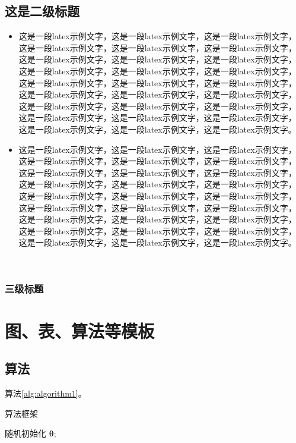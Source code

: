 \documentclass{template} %
\begin{document}
\begin{multicols}{2}
        \subsection{这是二级标题}
        \begin{itemize}
        \item 这是一段latex示例文字\cite{reddy2013polypharmacology}，这是一段latex示例文字，这是一段latex示例文字，这是一段latex示例文字，这是一段latex示例文字，这是一段latex示例文字，这是一段latex示例文字，这是一段latex示例文字，这是一段latex示例文字，这是一段latex示例文字，这是一段latex示例文字，这是一段latex示例文字，这是一段latex示例文字，这是一段latex示例文字，这是一段latex示例文字，这是一段latex示例文字，这是一段latex示例文字，这是一段latex示例文字，这是一段latex示例文字，这是一段latex示例文字，这是一段latex示例文字，这是一段latex示例文字，这是一段latex示例文字，这是一段latex示例文字，这是一段latex示例文字，这是一段latex示例文字，这是一段latex示例文字。

        \item 这是一段latex示例文字\cite{reddy2013polypharmacology}，这是一段latex示例文字，这是一段latex示例文字，这是一段latex示例文字，这是一段latex示例文字，这是一段latex示例文字，这是一段latex示例文字，这是一段latex示例文字，这是一段latex示例文字，这是一段latex示例文字，这是一段latex示例文字，这是一段latex示例文字，这是一段latex示例文字，这是一段latex示例文字，这是一段latex示例文字，这是一段latex示例文字，这是一段latex示例文字，这是一段latex示例文字，这是一段latex示例文字，这是一段latex示例文字，这是一段latex示例文字，这是一段latex示例文字，这是一段latex示例文字，这是一段latex示例文字，这是一段latex示例文字，这是一段latex示例文字，这是一段latex示例文字。
        \end{itemize} 

        \subsubsection{三级标题}
        
        
    \section{图、表、算法等模板}

\subsection{算法}
算法\ref{alg:algorithm1}。 


\vspace{0.5em}
\begin{algorithm}[H]
	\caption{算法框架}
	\label{alg:algorithm1}
	\BlankLine
        随机初始化 $\bm{\theta}$;
        

\end{algorithm}
\end{multicols}
\end{document}
